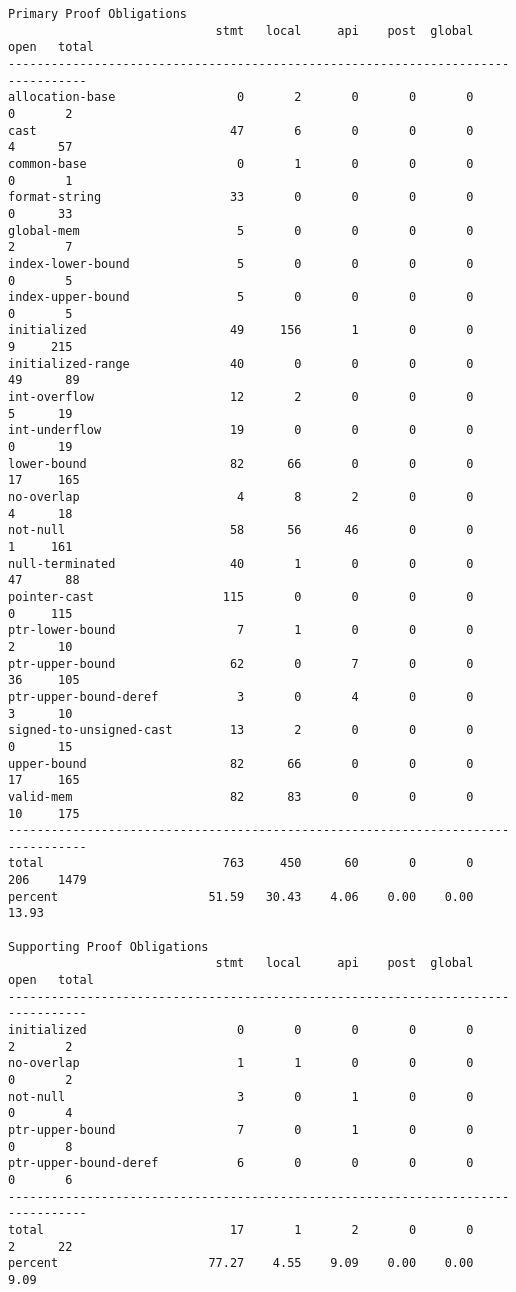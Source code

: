 \documentclass[11pt]{article}
\begin{document}
\begin{small}
\begin{verbatim}
Primary Proof Obligations
                             stmt   local     api    post  global    open   total
---------------------------------------------------------------------------------
allocation-base                 0       2       0       0       0       0       2
cast                           47       6       0       0       0       4      57
common-base                     0       1       0       0       0       0       1
format-string                  33       0       0       0       0       0      33
global-mem                      5       0       0       0       0       2       7
index-lower-bound               5       0       0       0       0       0       5
index-upper-bound               5       0       0       0       0       0       5
initialized                    49     156       1       0       0       9     215
initialized-range              40       0       0       0       0      49      89
int-overflow                   12       2       0       0       0       5      19
int-underflow                  19       0       0       0       0       0      19
lower-bound                    82      66       0       0       0      17     165
no-overlap                      4       8       2       0       0       4      18
not-null                       58      56      46       0       0       1     161
null-terminated                40       1       0       0       0      47      88
pointer-cast                  115       0       0       0       0       0     115
ptr-lower-bound                 7       1       0       0       0       2      10
ptr-upper-bound                62       0       7       0       0      36     105
ptr-upper-bound-deref           3       0       4       0       0       3      10
signed-to-unsigned-cast        13       2       0       0       0       0      15
upper-bound                    82      66       0       0       0      17     165
valid-mem                      82      83       0       0       0      10     175
---------------------------------------------------------------------------------
total                         763     450      60       0       0     206    1479
percent                     51.59   30.43    4.06    0.00    0.00   13.93

Supporting Proof Obligations
                             stmt   local     api    post  global    open   total
---------------------------------------------------------------------------------
initialized                     0       0       0       0       0       2       2
no-overlap                      1       1       0       0       0       0       2
not-null                        3       0       1       0       0       0       4
ptr-upper-bound                 7       0       1       0       0       0       8
ptr-upper-bound-deref           6       0       0       0       0       0       6
---------------------------------------------------------------------------------
total                          17       1       2       0       0       2      22
percent                     77.27    4.55    9.09    0.00    0.00    9.09

\end{verbatim}
\end{small}
\end{document}
